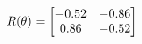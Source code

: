 \documentclass[preview]{standalone}
\begin{document}
\begin{align*}
\special{dvisvgm:raw <g id='unique000'>}R(\theta) = \begin{bmatrix}-0.52 & -0.86\\0.86 & -0.52\end{bmatrix}\special{dvisvgm:raw </g>}
\end{align*}
\end{document}

